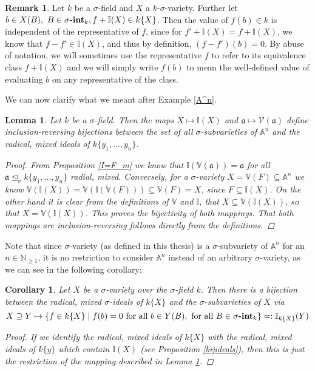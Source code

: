 \documentclass{article}
\def\I{\mathbb{I}}
\def\NE{\mathbb{N}_{\geq1}}
\def\V{\mathcal{V}}
\def\VV{\mathbb{V}}
\def\a{\mathfrak{a}}
\def\s{\sigma}
\def\si{\unlhd_{\sigma}}
\def\fa{\text{ for all }}
\newcommand{\catname}[1]{{\normalfont\textbf{#1}}}
\newcommand{\sintk}{\s\text{\catname{-int}}_k}
\newenvironment{bew}{\begin{proof}[Proof]}{\end{proof}}
\theoremstyle{plain}
\newtheorem{cor}[Satz]{Corollary}
\newtheorem{lem}[Satz]{Lemma}
\theoremstyle{definition}
\newtheorem{rem}[Satz]{Remark}
\begin{document}
\begin{rem}
Let $k$ be a $\s$-field and $X$ a $k$-$\s$-variety. Further let $b \in X(B), ~ B \in \sintk, f + \I(X) \in k\{X\}$. Then the value of $f(b) \in k$ is independent of the representative of $f$,
since for $f' + \I(X) = f + \I(X)$, we know that $f - f' \in \I(X)$, and thus by definition, $(f - f')(b) = 0$. By abuse of notation,
we will sometimes use the representative $f$ to refer to its equivalence class $f + \I(X)$ and we will simply write $f(b)$ to mean the well-defined value of evaluating $b$ on any representative of the class.
\end{rem}

We can now clarify what we meant after Example \ref{A^n}.

 \begin{lem}\label{bijsubvarsideals}
Let $k$ be a $\s$-field. Then the maps $X \mapsto \I(X)$ and $\a \mapsto \V(\a)$ define inclusion-reversing bijections between the set of all $\s$-subvarieties of $\mathbb{A}^n$ and the radical, mixed ideals of $k\{y_1,\ldots,y_n\}$.
\begin{bew}
From Proposition \ref{I=F_m} we know that $\I(\VV(\a)) = \a$ for all $\a \si k\{y_1,\ldots,y_n\}$ radial, mixed. Conversely, for a $\s$-variety $X = \VV(F) \subseteq \mathbb{A}^n$ we know  $\VV(\I(X)) = \VV(\I(\VV(F))) \subseteq \VV(F) = X$,
 since $F \subseteq \I(X)$. On the other hand it is clear from the definitions of $\VV$ and $ \I$, that $X \subseteq \VV(\I(X))$, so that $X = \VV(\I(X))$. This proves the bijectivity of both mappings. That both mappings are inclusion-reversing follows directly from the definitions.
\end{bew}
\end{lem}

Note that since $\s$-variety (as defined in this thesis) is a $\s$-subvariety of $\mathbb{A}^n$ for an $n \in \NE$, it is no restriction to consider $\mathbb{A}^n$ instead of an arbitrary $\s$-variety, as we can see in the following corollary:
\begin{cor}
  Let $X$ be a $\s$-variety over the $\s$-field $k$. Then there is a bijection between the radical, mixed $\s$-ideals of $k\{X\}$ and the $\s$-subvarieties of $X$ via
 $$X \supseteq Y \mapsto \{f \in k\{X\} \mid f(b) = 0 \fa b \in Y(B), \fa B \in \sintk \} =: \I_{k\{X\}}(Y)$$
\begin{bew}
If we identify the radical, mixed ideals of $k\{X\}$ with the radical, mixed ideals of $k\{y\}$ which contain $\I(X)$ (see Proposition \ref{bijideals}), then this is just the restriction of the mapping described in Lemma \ref{bijsubvarsideals}.
\end{bew}
\end{cor}
\end{document}
